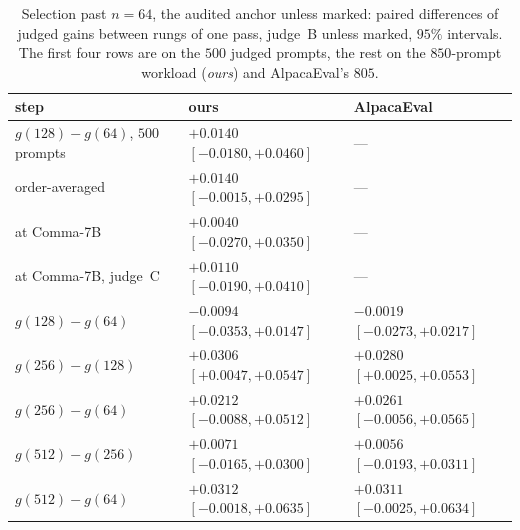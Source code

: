 \begin{table}[ht]
\centering\footnotesize
\caption{Selection past $n=64$, the audited anchor unless marked: paired differences of judged gains between rungs of one pass,
judge~B unless marked, $95\%$ intervals. The first four rows are on the $500$ judged prompts, the rest on
the $850$-prompt workload (\emph{ours}) and AlpacaEval's $805$.}
\label{tab:ladder}
\setlength{\tabcolsep}{5pt}
\begin{tabular}{@{}lll@{}}
\toprule
step & ours & AlpacaEval \\
\midrule
$g(128)-g(64)$, $500$ prompts & $+0.0140$ $[-0.0180, +0.0460]$ & --- \\
\quad order-averaged & $+0.0140$ $[-0.0015, +0.0295]$ & --- \\
\quad at Comma-7B & $+0.0040$ $[-0.0270, +0.0350]$ & --- \\
\quad at Comma-7B, judge~C & $+0.0110$ $[-0.0190, +0.0410]$ & --- \\
$g(128)-g(64)$ & $-0.0094$ $[-0.0353, +0.0147]$ & $-0.0019$ $[-0.0273, +0.0217]$ \\
$g(256)-g(128)$ & $+0.0306$ $[+0.0047, +0.0547]$ & $+0.0280$ $[+0.0025, +0.0553]$ \\
$g(256)-g(64)$ & $+0.0212$ $[-0.0088, +0.0512]$ & $+0.0261$ $[-0.0056, +0.0565]$ \\
$g(512)-g(256)$ & $+0.0071$ $[-0.0165, +0.0300]$ & $+0.0056$ $[-0.0193, +0.0311]$ \\
$g(512)-g(64)$ & $+0.0312$ $[-0.0018, +0.0635]$ & $+0.0311$ $[-0.0025, +0.0634]$ \\
\bottomrule
\end{tabular}
\end{table}


